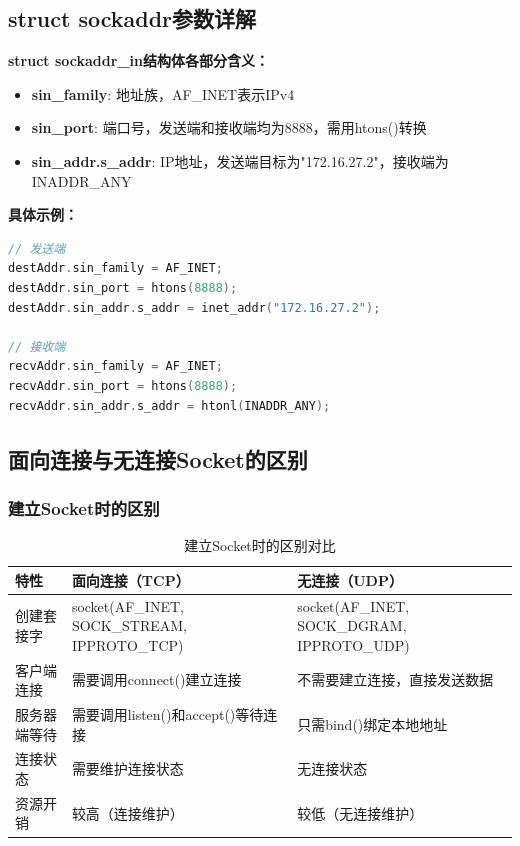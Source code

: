 \documentclass[a4paper]{article}
\begin{document}
\subsection{struct sockaddr参数详解}

\begin{myquote}
\textbf{struct sockaddr\_in结构体各部分含义：}
\begin{itemize}
    \item \textbf{sin\_family}: 地址族，AF\_INET表示IPv4
    \item \textbf{sin\_port}: 端口号，发送端和接收端均为8888，需用htons()转换
    \item \textbf{sin\_addr.s\_addr}: IP地址，发送端目标为"172.16.27.2"，接收端为INADDR\_ANY
\end{itemize}

\textbf{具体示例：}
\begin{lstlisting}[language=C]
// 发送端
destAddr.sin_family = AF_INET;
destAddr.sin_port = htons(8888);
destAddr.sin_addr.s_addr = inet_addr("172.16.27.2");

// 接收端
recvAddr.sin_family = AF_INET;
recvAddr.sin_port = htons(8888);
recvAddr.sin_addr.s_addr = htonl(INADDR_ANY);
\end{lstlisting}
\end{myquote}

\subsection{面向连接与无连接Socket的区别}

\subsubsection{建立Socket时的区别}

\begin{table}[H]
    \centering
    \caption{建立Socket时的区别对比}
    \begin{tabular}{@{}p{}p{}p{}@{}}
        \toprule
        \textbf{特性} & \textbf{面向连接（TCP）} & \textbf{无连接（UDP）} \\
        \midrule
        创建套接字 & socket(AF\_INET, SOCK\_STREAM, IPPROTO\_TCP) & socket(AF\_INET, SOCK\_DGRAM, IPPROTO\_UDP) \\
        \midrule
        客户端连接 & 需要调用connect()建立连接 & 不需要建立连接，直接发送数据 \\
        \midrule
        服务器端等待 & 需要调用listen()和accept()等待连接 & 只需bind()绑定本地地址 \\
        \midrule
        连接状态 & 需要维护连接状态 & 无连接状态 \\
        \midrule
        资源开销 & 较高（连接维护） & 较低（无连接维护） \\
        \bottomrule
    \end{tabular}
\end{table}
\end{document}
